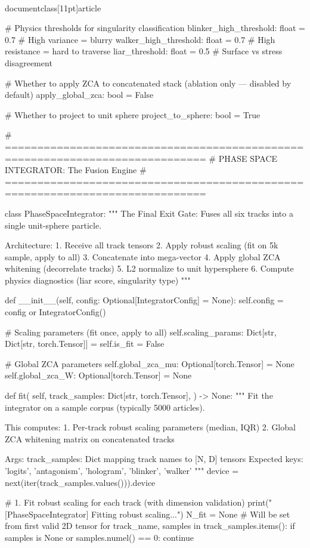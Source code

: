 \\documentclass[11pt]{article}
\begin{document}
\begin{CodeBlock}
    # Physics thresholds for singularity classification
    blinker_high_threshold: float = 0.7   # High variance = blurry
    walker_high_threshold: float = 0.7    # High resistance = hard to traverse
    liar_threshold: float = 0.5           # Surface vs stress disagreement

    # Whether to apply ZCA to concatenated stack (ablation only — disabled by default)
    apply_global_zca: bool = False

    # Whether to project to unit sphere
    project_to_sphere: bool = True


# =============================================================================
# PHASE SPACE INTEGRATOR: The Fusion Engine
# =============================================================================

class PhaseSpaceIntegrator:
    """
    The Final Exit Gate: Fuses all six tracks into a single unit-sphere particle.

    Architecture:
    1. Receive all track tensors
    2. Apply robust scaling (fit on 5k sample, apply to all)
    3. Concatenate into mega-vector
    4. Apply global ZCA whitening (decorrelate tracks)
    5. L2 normalize to unit hypersphere
    6. Compute physics diagnostics (liar score, singularity type)
    """

    def __init__(self, config: Optional[IntegratorConfig] = None):
        self.config = config or IntegratorConfig()

        # Scaling parameters (fit once, apply to all)
        self.scaling_params: Dict[str, Dict[str, torch.Tensor]] = {}
        self.is_fit = False

        # Global ZCA parameters
        self.global_zca_mu: Optional[torch.Tensor] = None
        self.global_zca_W: Optional[torch.Tensor] = None

    def fit(
        self,
        track_samples: Dict[str, torch.Tensor],
    ) -> None:
        """
        Fit the integrator on a sample corpus (typically 5000 articles).

        This computes:
        1. Per-track robust scaling parameters (median, IQR)
        2. Global ZCA whitening matrix on concatenated tracks

        Args:
            track_samples: Dict mapping track names to [N, D] tensors
                Expected keys: 'logits', 'antagonism', 'hologram', 'blinker', 'walker'
        """
        device = next(iter(track_samples.values())).device

        # 1. Fit robust scaling for each track (with dimension validation)
        print("[PhaseSpaceIntegrator] Fitting robust scaling...")
        N_fit = None  # Will be set from first valid 2D tensor
        for track_name, samples in track_samples.items():
            if samples is None or samples.numel() == 0:
                continue


\end{CodeBlock}
\end{document}
